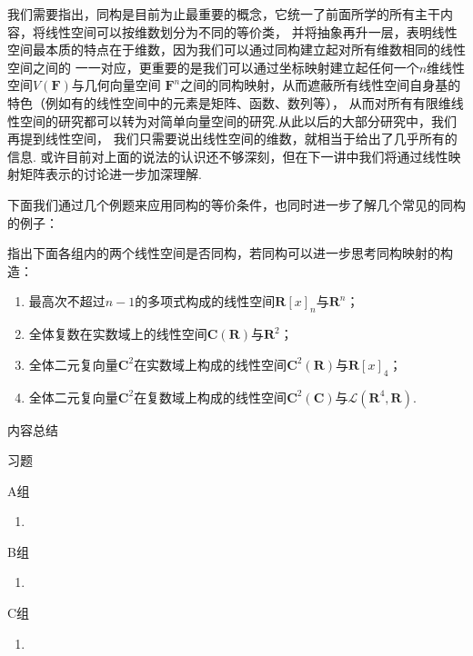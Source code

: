 我们需要指出，同构是目前为止最重要的概念，它统一了前面所学的所有主干内容，将线性空间可以按维数划分为不同的等价类，
并将抽象再升一层，表明线性空间最本质的特点在于维数，因为我们可以通过同构建立起对所有维数相同的线性空间之间的
一一对应，更重要的是我们可以通过坐标映射建立起任何一个$n$维线性空间$V(\mathbf{F})$与几何向量空间
$\mathbf{F}^n$之间的同构映射，从而遮蔽所有线性空间自身基的特色（例如有的线性空间中的元素是矩阵、函数、数列等），
从而对所有有限维线性空间的研究都可以转为对简单向量空间的研究.从此以后的大部分研究中，我们再提到线性空间，
我们只需要说出线性空间的维数，就相当于给出了几乎所有的信息.
或许目前对上面的说法的认识还不够深刻，但在下一讲中我们将通过线性映射矩阵表示的讨论进一步加深理解.

下面我们通过几个例题来应用同构的等价条件，也同时进一步了解几个常见的同构的例子：
\begin{example}
    指出下面各组内的两个线性空间是否同构，若同构可以进一步思考同构映射的构造：
    \begin{enumerate}
        \item 最高次不超过$n-1$的多项式构成的线性空间$\mathbf{R}[x]_n$与$\mathbf{R}^n$；

        \item 全体复数在实数域上的线性空间$\mathbf{C}(\mathbf{R})$与$\mathbf{R}^2$；

        \item 全体二元复向量$\mathbf{C}^2$在实数域上构成的线性空间$\mathbf{C}^2(\mathbf{R})$与$\mathbf{R}[x]_4$；

        \item 全体二元复向量$\mathbf{C}^2$在复数域上构成的线性空间$\mathbf{C}^2(\mathbf{C})$与$\mathcal{L}(\mathbf{R}^4,\mathbf{R})$.
    \end{enumerate}
\end{example}
\begin{solution}

\end{solution}

\vspace{2ex}
\centerline{\heiti \Large 内容总结}

\vspace{2ex}

\centerline{\heiti \Large 习题}
\vspace{2ex}
{\kaishu }
\begin{flushright}
    \kaishu

\end{flushright}
\centerline{\heiti A组}
\begin{enumerate}
    \item
\end{enumerate}
\centerline{\heiti B组}
\begin{enumerate}
    \item
\end{enumerate}
\centerline{\heiti C组}
\begin{enumerate}
    \item
\end{enumerate}

